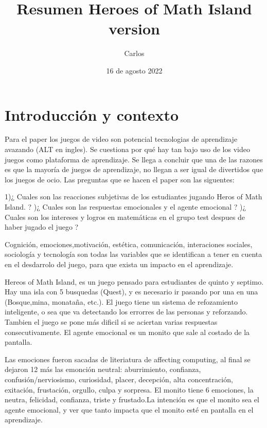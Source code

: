 \documentclass{article}
\author{Carlos}
\title{Resumen Heroes of Math Island version {\LaTex} }
\date{16 de agosto 2022}
\begin{document}
\maketitle

\section{Introducción y contexto}
    Para el paper los juegos de video son potencial tecnologias de aprendizaje avazando (ALT en ingles). Se cuestiona por qué hay tan bajo uso de los video juegos como plataforma de aprendizaje. Se llega a concluir que una de las razones es que la mayoría de juegos de aprendizaje, no llegan a ser igual de divertidos que los juegos de ocio. Las preguntas que se hacen el paper son las siguentes:
\newline 
\newline 


1)¿ Cuales son las reacciones subjetivas de los estudiantes jugando Heros of Math Island. ?
\newline 
{})¿ Cuales son las respuestas emocionales y el agente emocional ?
\newline 
{})¿ Cuales son los intereses y logros en matemáticas en el grupo test despues de haber jugado el juego ?
\newline 
\newline 


    Cognición, emociones,motivación, estética, comunicación, interaciones sociales, sociología y tecnología son todas las variables que se identifican  a tener en cuenta en el desdarrolo del juego, para que exista un impacto en el aprendizaje.
\newline 
\newline 


    Hereos of Math Island, es un juego pensado para estudiantes de quinto y septimo. Hay una isla con 5 busquedas (Quest), y es necesario ir pasando por una en una (Bosque,mina, monataña, etc.). El juego tiene un sistema de refozamiento inteligente, o sea que va detectando los errorres de las personas y reforzando. Tambien el juego se pone más dificil si se aciertan varias respuestas consecutivamente. El agente emocional es un monito que sale al costado de la pantalla.
\newline 
\newline 


    Las emociones fueron sacadas de literiatura de affecting computing, al final se dejaron 12 más las emonción neutral: aburrimiento, confianza, confusión/nerviosismo, curiosidad, placer, decepción, alta concentración, exitación, frustación, orgullo, culpa y sorpresa. El monito tiene 6 emociones, la neutra, felicidad, confianza, triste y frustado.La intención es que el monito sea el agente emocional, y ver que tanto impacta que el monito esté en pantalla en el aprendizaje.  
\newline 
\newline 
\end{document}
